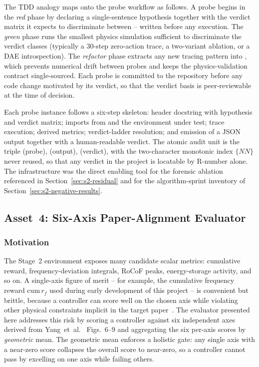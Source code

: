 \documentclass{unnc-fyp}
\begin{document}
The TDD analogy maps onto the probe workflow as follows.
A probe begins in the \emph{red} phase by declaring a
single-sentence hypothesis together with the verdict matrix it
expects to discriminate between -- written before any
execution.
The \emph{green} phase runs the smallest physics simulation
sufficient to discriminate the verdict classes (typically a
$30$-step zero-action trace, a two-variant ablation, or a DAE
introspection).
The \emph{refactor} phase extracts any new tracing pattern into
, which prevents numerical drift between probes
and keeps the physics-validation contract single-sourced.
Each probe is committed to the repository before any code change
motivated by its verdict, so that the verdict basis is
peer-reviewable at the time of decision.

Each probe instance follows a six-step skeleton: header
docstring with hypothesis and verdict matrix; imports from
 and the environment under test; trace
execution; derived metrics; verdict-ladder resolution; and
emission of a JSON output together with a human-readable
verdict.
The atomic audit unit is the triple
 (probe), 
(output),  (verdict), with the
two-character monotonic index $\{NN\}$ never reused, so that any
verdict in the project is locatable by R-number alone.
The infrastructure was the direct enabling tool for the
forensic ablation referenced in Section~\ref{sec:s2-residual}
and for the algorithm-sprint inventory of
Section~\ref{sec:s2-negative-results}.

\subsection{Asset~4: Six-Axis Paper-Alignment Evaluator}
\label{sec:asset-six-axis}

\subsubsection{Motivation}

The Stage~2 environment exposes many candidate scalar metrics:
cumulative reward, frequency-deviation integrals, RoCoF peaks,
energy-storage activity, and so on.
A single-axis figure of merit -- for example, the cumulative
frequency reward $\mathrm{cum}\,r_f$ used during early development
of this project -- is convenient but brittle, because a controller
can score well on the chosen axis while violating other physical
constraints implicit in the target paper~\cite{yang2023ddic}.
The evaluator presented here addresses this risk by scoring a
controller against six independent axes derived from
Yang~et~al.~\cite{yang2023ddic} Figs.~6--9 and aggregating the
six per-axis scores by \emph{geometric} mean.
The geometric mean enforces a holistic gate: any single axis with
a near-zero score collapses the overall score to near-zero, so a
controller cannot pass by excelling on one axis while failing
others.
\end{document}
